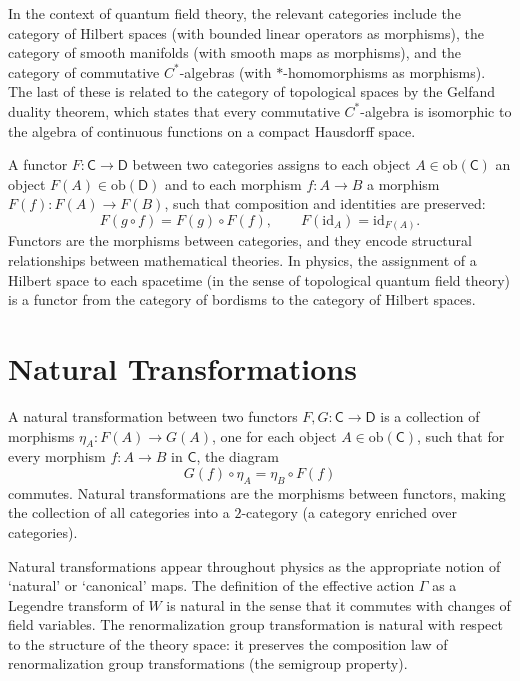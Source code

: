 \documentclass[11pt, twoside, openright]{book}
\theoremstyle{dotted}
\theoremstyle{definition}
\begin{document}
In the context of quantum field theory, the relevant categories include the category
of Hilbert spaces (with bounded linear operators as morphisms), the category of
smooth manifolds (with smooth maps as morphisms), and the category of commutative
$C^*$-algebras (with $*$-homomorphisms as morphisms). The last of these is related
to the category of topological spaces by the Gelfand duality theorem, which states
that every commutative $C^*$-algebra is isomorphic to the algebra of continuous
functions on a compact Hausdorff space.

A functor $F: \mathsf{C} \to \mathsf{D}$ between two categories assigns to each
object $A \in \mathrm{ob}(\mathsf{C})$ an object $F(A) \in \mathrm{ob}(\mathsf{D})$
and to each morphism $f: A \to B$ a morphism $F(f): F(A) \to F(B)$, such that
composition and identities are preserved:
\begin{equation}
  F(g \circ f) = F(g) \circ F(f), \qquad F(\mathrm{id}_A) = \mathrm{id}_{F(A)}.
  \label{eq:functor_axioms}
\end{equation}
Functors are the morphisms between categories, and they encode structural
relationships between mathematical theories. In physics, the assignment of a
Hilbert space to each spacetime (in the sense of topological quantum field theory)
is a functor from the category of bordisms to the category of Hilbert spaces.

\section{Natural Transformations}

A natural transformation between two functors $F, G: \mathsf{C} \to \mathsf{D}$
is a collection of morphisms $\eta_A: F(A) \to G(A)$, one for each object $A
\in \mathrm{ob}(\mathsf{C})$, such that for every morphism $f: A \to B$ in
$\mathsf{C}$, the diagram
\begin{equation}
  G(f) \circ \eta_A = \eta_B \circ F(f)
  \label{eq:naturality}
\end{equation}
commutes. Natural transformations are the morphisms between functors, making the
collection of all categories into a $2$-category (a category enriched over categories).

Natural transformations appear throughout physics as the appropriate notion of
`natural' or `canonical' maps. The definition of the effective action $\Gamma$ as
a Legendre transform of $W$ is natural in the sense that it commutes with changes
of field variables. The renormalization group transformation is natural with respect
to the structure of the theory space: it preserves the composition law of
renormalization group transformations (the semigroup property).
\end{document}
